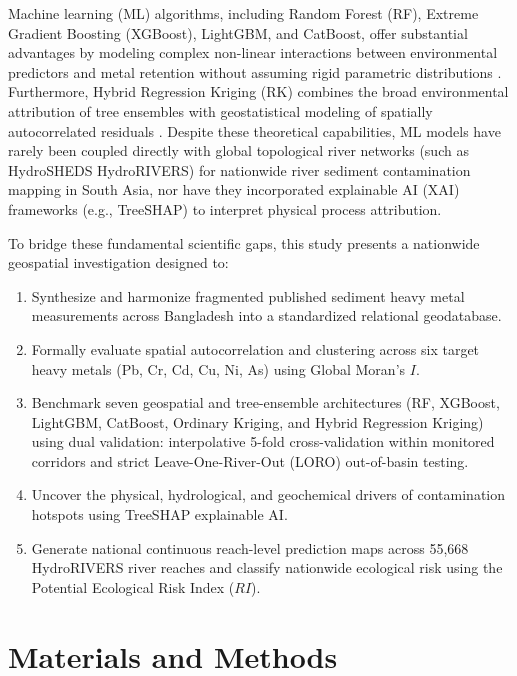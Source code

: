 \documentclass[authoryear,preprint,12pt]{elsarticle}
\begin{document}
Machine learning (ML) algorithms, including Random Forest (RF), Extreme Gradient Boosting (XGBoost), LightGBM, and CatBoost, offer substantial advantages by modeling complex non-linear interactions between environmental predictors and metal retention without assuming rigid parametric distributions \citep{Breiman2001,Chen2016,Ke2017,Prokhorenkova2018}. Furthermore, Hybrid Regression Kriging (RK) combines the broad environmental attribution of tree ensembles with geostatistical modeling of spatially autocorrelated residuals \citep{Hengl2004}. Despite these theoretical capabilities, ML models have rarely been coupled directly with global topological river networks (such as HydroSHEDS HydroRIVERS) for nationwide river sediment contamination mapping in South Asia, nor have they incorporated explainable AI (XAI) frameworks (e.g., TreeSHAP) to interpret physical process attribution.

To bridge these fundamental scientific gaps, this study presents a nationwide geospatial investigation designed to:
\begin{enumerate}
    \item Synthesize and harmonize fragmented published sediment heavy metal measurements across Bangladesh into a standardized relational geodatabase.
    \item Formally evaluate spatial autocorrelation and clustering across six target heavy metals (Pb, Cr, Cd, Cu, Ni, As) using Global Moran's $I$.
    \item Benchmark seven geospatial and tree-ensemble architectures (RF, XGBoost, LightGBM, CatBoost, Ordinary Kriging, and Hybrid Regression Kriging) using dual validation: interpolative 5-fold cross-validation within monitored corridors and strict Leave-One-River-Out (LORO) out-of-basin testing.
    \item Uncover the physical, hydrological, and geochemical drivers of contamination hotspots using TreeSHAP explainable AI.
    \item Generate national continuous reach-level prediction maps across 55,668 HydroRIVERS river reaches and classify nationwide ecological risk using the Potential Ecological Risk Index ($RI$).
\end{enumerate}

\section{Materials and Methods}
\end{document}
